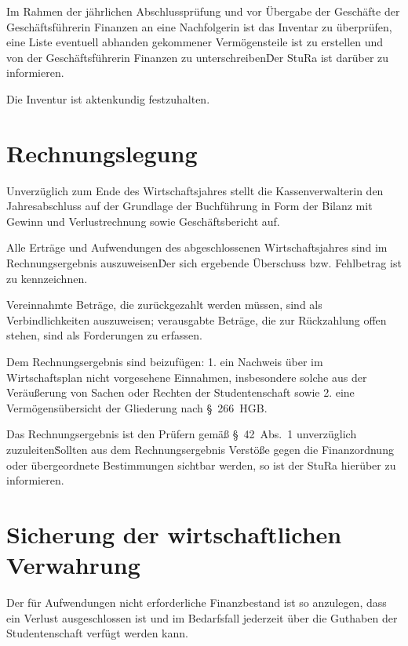 {\begin{multicols}{2}
\Abs \Satz Im Rahmen der jährlichen Abschlussprüfung und vor Übergabe der Geschäfte der Geschäftsführerin Finanzen an eine Nachfolgerin ist das Inventar zu überprüfen, eine Liste eventuell abhanden gekommener Vermögensteile ist zu erstellen und von der Geschäftsführerin Finanzen zu unterschreiben\. Der StuRa ist darüber zu informieren.

\Abs \Satz Die Inventur ist aktenkundig festzuhalten.



\section{Rechnungslegung}

\Abs \Satz Unverzüglich zum Ende des Wirtschaftsjahres stellt die Kassenverwalterin den Jahresabschluss auf der Grundlage der Buchführung in Form der Bilanz mit Gewinn und Verlustrechnung sowie Geschäftsbericht auf.

\Abs \Satz Alle Erträge und Aufwendungen des abgeschlossenen Wirtschaftsjahres sind im Rechnungsergebnis auszuweisen\. Der sich ergebende Überschuss bzw. Fehlbetrag ist zu kennzeichnen.

\Abs \Satz Vereinnahmte Beträge, die zurückgezahlt werden müssen, sind als Verbindlichkeiten auszuweisen; verausgabte Beträge, die zur Rückzahlung offen stehen, sind als Forderungen zu erfassen.

\Abs \Satz Dem Rechnungsergebnis sind beizufügen:
1. ein Nachweis über im Wirtschaftsplan nicht vorgesehene Einnahmen, insbesondere solche aus der Veräußerung von Sachen oder Rechten der Studentenschaft sowie
2. eine Vermögensübersicht der Gliederung nach §~266~HGB.

\Abs \Satz Das Rechnungsergebnis ist den Prüfern gemäß §~42~Abs.~1 unverzüglich zuzuleiten\. Sollten aus dem Rechnungsergebnis Verstöße gegen die Finanzordnung oder übergeordnete Bestimmungen sichtbar werden, so ist der StuRa hierüber zu informieren.



\section{Sicherung der wirtschaftlichen Verwahrung}

\Abs \Satz Der für Aufwendungen nicht erforderliche Finanzbestand ist so anzulegen, dass ein Verlust ausgeschlossen ist und im Bedarfsfall jederzeit über die Guthaben der Studentenschaft verfügt werden kann.


\end{multicols}}
